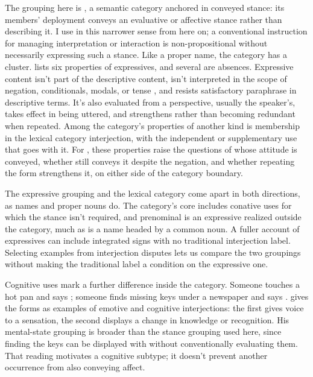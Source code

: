 \documentclass[12pt]{article}
\begin{document}
The grouping here is , a semantic category
anchored in conveyed stance: its members' deployment conveys an evaluative
or affective stance rather than describing it. I use  in
this narrower sense from here on; a conventional instruction for managing
interpretation or interaction is non-propositional without necessarily
expressing such a stance. Like a proper name, the category has a
cluster. \textcite[166--167]{potts2007} lists six properties of
expressives, and several are absences. Expressive content isn't part of the
descriptive content, isn't interpreted in the scope of negation,
conditionals, modals, or tense \citep[170--171]{potts2007}, and resists
satisfactory paraphrase in descriptive terms. It's also evaluated from a
perspective, usually the speaker's, takes effect in being uttered, and
strengthens rather than becoming redundant when repeated. Among the category's
properties of another kind is membership in the lexical category
interjection, with the independent or supplementary use that goes with it. For , these
properties raise the questions of whose attitude is conveyed, whether
 still conveys it despite the negation,
and whether repeating the form strengthens it, on either side of the
category boundary.

The expressive grouping and the lexical category come apart in both
directions, as names and proper nouns do. The category's core includes
conative uses for which the stance isn't required, and prenominal
 is an expressive realized outside the category, much as
 is a name headed by a common noun. A fuller account of expressives can include integrated signs
with no traditional interjection label. Selecting examples from interjection
disputes lets us compare the two groupings without making the traditional
label a condition on the expressive one.

Cognitive uses mark a further difference inside the category. Someone
touches a hot pan and says ; someone finds missing keys
under a newspaper and says . \textcite[113]{ameka1992}
gives the forms as examples of emotive and cognitive interjections: the
first gives voice to a sensation, the second displays a change in
knowledge or recognition. His mental-state grouping is broader than the
stance grouping used here, since finding the keys can be displayed with
 without conventionally evaluating them. That reading
motivates a cognitive subtype; it doesn't prevent another occurrence from
also conveying affect.
\end{document}
